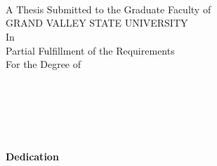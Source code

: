
\thispagestyle{empty}

\begingroup
\centering
\doublespacing

\DocumentTitle \\
\AuthorFullName \\
~\\[4.5\baselineskip]
A Thesis Submitted to the Graduate Faculty of \\
GRAND VALLEY STATE UNIVERSITY \\
In \\
Partial Fulfillment of the Requirements \\
For the Degree of \\
\Degree \\
~\\
\AcademicUnit \\
~\\[4\baselineskip]
\Month~\Year

\endgroup
\clearpage


\ifIncludeForms
    
    \setcounter{page}{3}
\else
\fi


\ifx\Dedication\empty
\else
    \begingroup

    \centering
    \textbf{Dedication}

    \flushleft
    \Dedication

    \endgroup
    \clearpage
\fi


